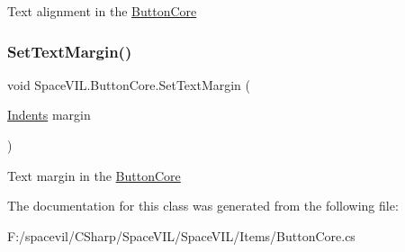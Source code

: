 Text alignment in the \mbox{\hyperlink{class_space_v_i_l_1_1_button_core}{Button\+Core}} 

\mbox{\label{class_space_v_i_l_1_1_button_core_ad1d215401ec59acf1c54cfa036606b0f}} 
\subsubsection{\texorpdfstring{Set\+Text\+Margin()}{SetTextMargin()}}
{\footnotesize\ttfamily void Space\+V\+I\+L.\+Button\+Core.\+Set\+Text\+Margin (\begin{DoxyParamCaption}\item[{\mbox{\hyperlink{struct_space_v_i_l_1_1_decorations_1_1_indents}{Indents}}}]{margin }\end{DoxyParamCaption})}



Text margin in the \mbox{\hyperlink{class_space_v_i_l_1_1_button_core}{Button\+Core}} 



The documentation for this class was generated from the following file\+:\begin{DoxyCompactItemize}
\item 
F\+:/spacevil/\+C\+Sharp/\+Space\+V\+I\+L/\+Space\+V\+I\+L/\+Items/Button\+Core.\+cs\end{DoxyCompactItemize}
